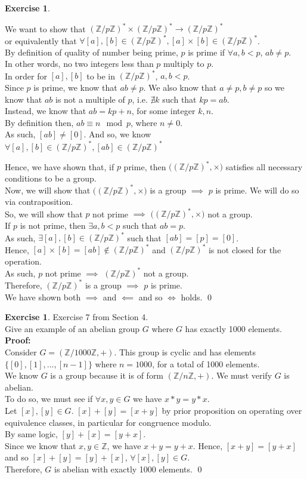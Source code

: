 \documentclass[12pt]{article}
\providecommand{\x}{\times}
\theoremstyle{definition}
\newtheorem{exercise}[theorem]{Exercise}
\newcommand{\Z}{\mathbb{Z}}
\newcommand{\V}{\vspace{0.3cm}\\}
\newcommand{\pro}{\V \textbf{Proof:} \V}
\begin{document}
\begin{exercise}
\begin{enumerate}
We want to show that $(\Z/p\Z)^* \x (\Z/p\Z)^* \rightarrow (\Z/p\Z)^*$ \\ or equivalently that $\forall [a],[b] \in (\Z/p\Z)^*, [a]\x[b] \in (\Z/p\Z)^*$. \V
By definition of quality of number being prime, $p$ is prime if $\forall a,b < p$, $ab \neq p$. \\
In other words, no two integers less than $p$ multiply to $p$. \V
In order for $[a],[b]$ to be in $(\Z/p\Z)^*$, $a,b < p$.\\
Since $p$ is prime, we know that $ab \neq p$. We also know that $a \neq p, b\neq p$ so we know that $ab$ is not a multiple of $p$, i.e. $\nexists k$ such that $kp = ab$. \V
Instead, we know that $ab = kp + n$, for some integer $k,n$. \\
By definition then, $ab \equiv n \mod p$, where $n \neq 0$.\\ As such, $[ab] \neq [0]$.  And so, we know $\forall [a],[b] \in (\Z/p\Z)^*, [ab] \in (\Z/p\Z)^*$ 
\end{enumerate} 
Hence, we have shown that, if $p$ prime, then $\big((\Z/p\Z)^*, \x\big)$ satisfies all necessary conditions to be a group. \V
Now, we will show that $\big((\Z/p\Z)^*, \x\big)$ is a group $\implies$ $p$ is prime. We will do so via contraposition. \V
So, we will show that $p$ not prime $\implies$ $\big((\Z/p\Z)^*, \x\big)$ not a group. \V 
If $p$ is not prime, then $\exists a,b < p$ such that $ab =p$.\\
As such, $\exists [a],[b] \in (\Z/p\Z)^*$ such that $[ab] = [p]= [0]$. \\
Hence, $[a] \x [b] = [ab] \not \in (\Z/p\Z)^*$ and $(\Z/p\Z)^*$ is not closed for the operation. \\
As such, $p$ not prime $\implies$ $(\Z/p\Z)^*$ not a group.\\
Therefore, $(\Z/p\Z)^*$ is a group $\implies$ $p$ is prime.\V
We have shown both $\implies$ and $\impliedby$ and so $\iff$ holds. \qed  

\end{exercise}

\begin{exercise} Exercise 7 from Section 4.\\
Give an example of an abelian group $G$ where $G$ has exactly 1000 elements. 
\pro
Consider $G = (\Z/1000\Z, +)$. This group is cyclic and has elements $\{[0],[1],...,[n-1]\}$ where $n=1000$, for a total of 1000 elements. \V
We know $G$ is a group because it is of form $(\Z/n\Z, +)$. We must verify $G$ is abelian.\\
To do so, we must see if $\forall x,y \in G$ we have $x*y = y*x$. \\
Let $[x], [y] \in G$. $[x]+[y] = [x+y]$ by prior proposition on operating over equivalence classes, in particular for congruence modulo.\\
By same logic, $[y] +[x] = [y+x]$. \\
Since we know that $x,y \in \Z$, we have $x+y = y+x$. Hence, $[x+y] = [y+x]$ and so $[x]+[y] = [y]+[x]$, $\forall [x],[y] \in G$.\\
Therefore, $G$ is abelian with exactly 1000 elements. \qed   
\newpage 

\end{exercise}
\end{document}
